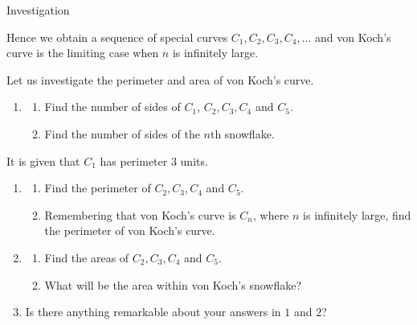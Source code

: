 \documentclass[11pt,a4paper]{book}
\begin{document}
\begin{investigation}[colbacktitle=green]{Investigation}
\medskip{}

Hence we obtain a sequence of special curves $C_{1},C_{2},C_{3},C_{4},\ldots$
and von Koch's curve is the limiting case when $n$ is infinitely
large.

\medskip{}

Let us investigate the perimeter and area of von Koch's curve.

\medskip{}

\begin{enumerate}

\item \begin{enumerate}[label=(\alph*)]

\item  Find the number of sides of $C_{1}$, $C_{2},C_{3},C_{4}$
and $C_{5}$.

\item  Find the number of sides of the $n\text{th}$ snowflake.

\end{enumerate}

\end{enumerate}

It is given that $C_{1}$ has perimeter $3$ units.

\begin{enumerate}[start=2]

\item \begin{enumerate}[label=(\alph*)]

\item  Find the perimeter of $C_{2},C_{3},C_{4}$ and $C_{5}$.

\item  Remembering that von Koch's curve is $C_{n}$, where $n$
is infinitely large, find the perimeter of von Koch's curve.

\end{enumerate}

\item \begin{enumerate}[label=(\alph*)]

\item  Find the areas of $C_{2},C_{3},C_{4}$ and $C_{5}$.

\item  What will be the area within von Koch's snowflake?

\end{enumerate}

\item  Is there anything remarkable about your answers in $1$ and
$2$?

\end{enumerate}
\end{investigation}
\end{document}
